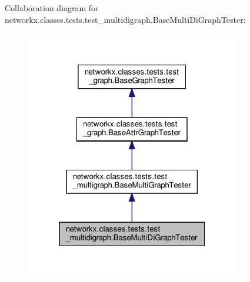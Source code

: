 Collaboration diagram for networkx.\+classes.\+tests.\+test\+\_\+multidigraph.\+Base\+Multi\+Di\+Graph\+Tester\+:
\nopagebreak
\begin{figure}[H]
\begin{center}
\leavevmode
\includegraphics[width=265pt]{classnetworkx_1_1classes_1_1tests_1_1test__multidigraph_1_1BaseMultiDiGraphTester__coll__graph}
\end{center}
\end{figure}
